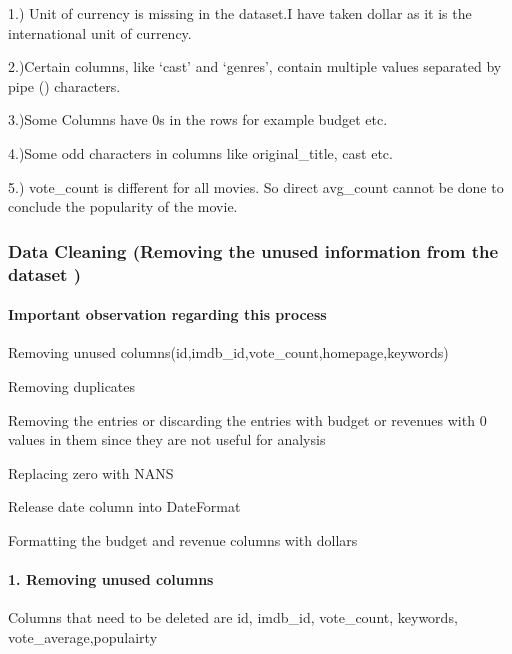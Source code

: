 \documentclass[11pt]{article}
\begin{document}
1.) Unit of currency is missing in the dataset.I have taken dollar as it
is the international unit of currency.

2.)Certain columns, like `cast' and `genres', contain multiple values
separated by pipe (\textbar{}) characters.

3.)Some Columns have 0s in the rows for example budget etc.

4.)Some odd characters in columns like original\_title, cast etc.

5.) vote\_count is different for all movies. So direct avg\_count cannot
be done to conclude the popularity of the movie.

\subsubsection{Data Cleaning (Removing the unused information from the
dataset
)}\label{data-cleaning-removing-the-unused-information-from-the-dataset}

    \paragraph{Important observation regarding this
process}\label{important-observation-regarding-this-process}

    Removing unused columns(id,imdb\_id,vote\_count,homepage,keywords)

Removing duplicates

Removing the entries or discarding the entries with budget or revenues
with 0 values in them since they are not useful for analysis

Replacing zero with NANS

Release date column into DateFormat

Formatting the budget and revenue columns with dollars

    \paragraph{1. Removing unused columns}\label{removing-unused-columns}

Columns that need to be deleted are id, imdb\_id, vote\_count, keywords,
vote\_average,populairty
\end{document}
